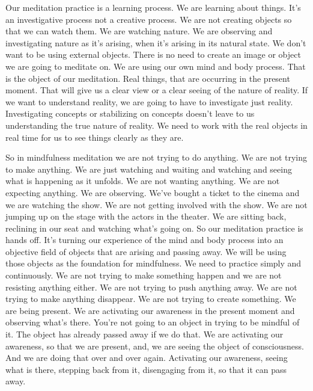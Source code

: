 \documentclass[letterpaper,10pt,english]{sphinxmanual}
\begin{document}
\sphinxAtStartPar
Our  meditation  practice  is  a  learning  process. We  are  learning  about
things. It’s an investigative process not a creative process. We are not creating  objects  so  that  we  can  watch  them. We  are  watching  nature. We  are
observing and investigating nature as it’s arising, when it’s arising in its natural  state.  We  don’t  want  to  be  using  external  objects.  There  is  no  need  to
create an image or object we are going to meditate on. We are using our own
mind  and  body  process. That  is  the  object  of  our  meditation.  Real  things,
that are occurring in the present moment. That will give us a clear view or a
clear seeing of the nature of reality. If we want to understand reality, we are
going to have to investigate just reality. Investigating concepts or stabilizing
   on concepts doesn’t leave to us understanding the true nature of reality. We
need to work with the real objects in real time for us to see things clearly as
they are.

\sphinxAtStartPar
So in mindfulness meditation we are not trying to do anything. We are
not trying to make anything. We are just watching and waiting and watching
and  seeing  what  is  happening  as  it  unfolds. We  are  not  wanting  anything.
We are not expecting anything. We are observing. We’ve bought a ticket to
the cinema and we are watching the show. We are not getting involved with
the show. We are not jumping up on the stage with the actors in the theater.
We are sitting back, reclining in our seat and watching what’s going on. So
our meditation practice is hands off. It’s turning our experience of the mind
and body process into an objective field of objects that are arising and passing away. We will be using those objects as the foundation for mindfulness.
We  need  to  practice  simply  and  continuously.  We  are  not  trying  to  make
something happen and we are not resisting anything either. We are not trying
to push anything away. We are not trying to make anything disappear. We
are not trying to create something. We are being present. We are activating
our awareness in the present moment and observing what’s there. You’re not
going to an object in trying to be mindful of it. The object has already passed
away if we do that. We are activating our awareness, so that we are present,
and, we are seeing the object of consciousness. And we are doing that over
and  over  again.  Activating  our  awareness,  seeing  what  is  there,  stepping
back from it, disengaging from it, so that it can pass away.
\end{document}
